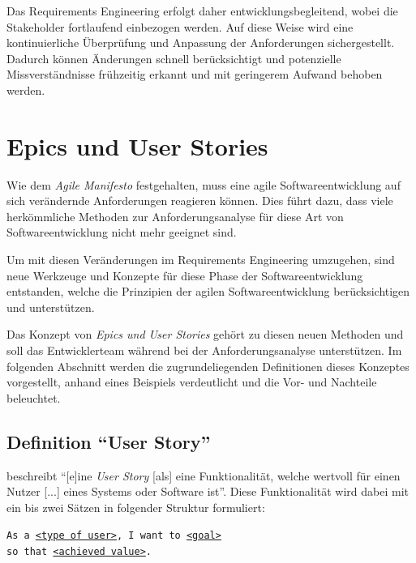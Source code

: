 \documentclass[acmtog]{acmart}
\begin{document}
Das Requirements Engineering erfolgt daher entwicklungsbegleitend, wobei die Stakeholder fortlaufend einbezogen werden. Auf diese Weise wird eine kontinuierliche Überprüfung und Anpassung der Anforderungen sichergestellt.
Dadurch können Änderungen schnell berücksichtigt und potenzielle Missverständnisse frühzeitig erkannt und mit geringerem Aufwand behoben werden.


\section{Epics und User Stories}
Wie dem \emph{Agile Manifesto} \cite{beedle_principles_2001} festgehalten, muss eine agile Softwareentwicklung
auf sich verändernde Anforderungen reagieren können.
Dies führt dazu, dass viele herkömmliche Methoden zur Anforderungsanalyse für diese Art von Softwareentwicklung
nicht mehr geeignet sind.

Um mit diesen Veränderungen im Requirements Engineering umzugehen, sind neue Werkzeuge und Konzepte
für diese Phase der Softwareentwicklung entstanden, welche die Prinzipien der agilen Softwareentwicklung
berücksichtigen und unterstützen.

Das Konzept von \emph{Epics und User Stories} gehört zu diesen neuen Methoden und soll das Entwicklerteam
während bei der Anforderungsanalyse unterstützen. Im folgenden Abschnitt werden die zugrundeliegenden Definitionen
dieses Konzeptes vorgestellt, anhand eines Beispiels verdeutlicht und die Vor- und Nachteile beleuchtet.

\subsection{Definition ``User Story''}
\cite[p. 4]{cohn_user_2004} beschreibt ``[e]ine \emph{User Story} [als] eine Funktionalität, welche wertvoll für einen Nutzer [...] eines Systems
oder Software ist''.
Diese Funktionalität wird dabei mit ein bis zwei Sätzen in folgender Struktur formuliert:

\vspace{1em}
\texttt{As a \underline{<type of user>}, I want to \underline{<goal>}\\
	\hspace*{13em} so that \underline{<achieved value>}.}
\begin{flushright}
	\cite[p. 499]{balzert09}
\end{flushright}


\vspace{.5em}
\end{document}
